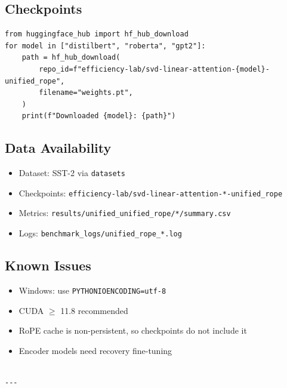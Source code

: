 \subsection{Checkpoints}

\begin{lstlisting}
from huggingface_hub import hf_hub_download
for model in ["distilbert", "roberta", "gpt2"]:
    path = hf_hub_download(
        repo_id=f"efficiency-lab/svd-linear-attention-{model}-unified_rope",
        filename="weights.pt",
    )
    print(f"Downloaded {model}: {path}")
\end{lstlisting}

\subsection{Data Availability}

\begin{itemize}
\item Dataset: SST-2 via \texttt{datasets}
\item Checkpoints: \texttt{efficiency-lab/svd-linear-attention-*-unified\_rope}
\item Metrics: \texttt{results/unified\_unified\_rope/*/summary.csv}
\item Logs: \texttt{benchmark\_logs/unified\_rope\_*.log}

\end{itemize}
\subsection{Known Issues}

\begin{itemize}
\item Windows: use \texttt{PYTHONIOENCODING=utf-8}
\item CUDA $\ge$ 11.8 recommended
\item RoPE cache is non-persistent, so checkpoints do not include it
\item Encoder models need recovery fine-tuning
\end{itemize}
\begin{lstlisting}

---
\end{lstlisting}